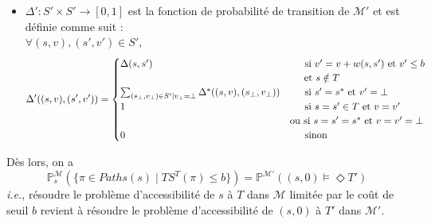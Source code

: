 \documentclass[12pt,a4paper]{report}
\theoremstyle{definition}%
\theoremstyle{remark}
\newcommand{\ie}{\textit{i.e.}, }
\newcommand{\pr}{\mathbb{P}}
\begin{document}
\begin{itemize}
\item $\Delta': S' \times S' \rightarrow [0,1]$ est la fonction de probabilité de transition de $\mathcal{M'}$ et est définie comme suit : \\
	$\forall (s, v), (s', v') \in S',$
\[
\Delta'((s, v), (s', v')) =  
\begin{cases}
\Delta(s, s') & \text{\quad \, si $v' = v + w(s, s')$ et $v' \leq b$}  \\
	& %
	\quad \;\, \text{et $s \notin T$} \\
\sum_{(s_\bot, v_\bot) \in S' | v_\bot = \bot} \Delta^*((s, v), (s_\bot, v_\bot)) & \quad \, \text{ si $s' = s^*$ et $v' = \bot$} \\
1 & \quad \, \text{ si $s = s' \in T$ et $v = v'$} \\
& \text{ou si $s = s' = s^*$ et $v = v' = \bot$} \\
0 & \quad \, \text{ sinon}
\end{cases}
\]
\end{itemize}
 Dès lors, on a \[\pr^\mathcal{M}_s(\{\pi \in Paths(s) \; | \; TS^T(\pi) \leq b \}) = \pr^\mathcal{M'}((s, 0) \models \Diamond T')\]
\ie résoudre le problème d'accessibilité de $s$ à $T$ dans $\mathcal{M}$ limitée par le coût de seuil $b$ revient à résoudre le problème d'accessibilité de $(s, 0)$ à $T'$ dans $\mathcal{M'}$.
\end{document}
